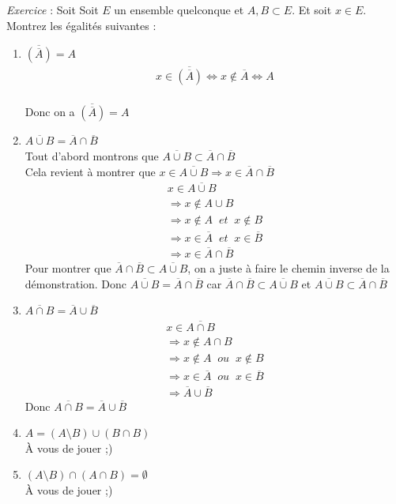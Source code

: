 \documentclass{report}
\begin{document}
\emph{Exercice} : Soit Soit $E$ un ensemble quelconque et $A,B \subset E$. Et soit $x \in E$. Montrez les égalités suivantes : 
\begin{enumerate}
    \item $\overline{(\overline{A})} = A$
        \begin{gather}
            x \in \overline{(\overline{A})} \Leftrightarrow x \notin \overline{A} \Leftrightarrow A
        \end{gather} \\
        Donc on a $\overline{(\overline{A})} = A$
    \item $\overline{A \cup B} = \overline{A} \cap \overline{B}$ \\ 
        Tout d’abord montrons que \begin{math}
            \overline{A \cup B} \subset \overline{A} \cap \overline{B}
        \end{math} \\ 
        Cela revient à montrer que $x \in \overline{A \cup B} \Rightarrow x \in \overline{A} \cap \overline{B} $ 
        \begin{gather}
            x \in \overline{A \cup B} \\ \Rightarrow x \notin A \cup B  \\ \Rightarrow  x \notin A \; \; et \; \; x \notin B \\ \Rightarrow x \in \overline{A} \; \; et \; \; x \in \overline{B} \\ \Rightarrow x \in \overline{A} \cap \overline{B}
        \end{gather}
        Pour montrer que $\overline{A} \cap \overline{B} \subset \overline{A \cup B}$, on a juste à faire le chemin inverse de la démonstration.
        Donc $\overline{A \cup B} = \overline{A} \cap \overline{B}$ car $\overline{A} \cap \overline{B} \subset \overline{A \cup B}$ et $\overline{A \cup B}  \subset \overline{A} \cap \overline{B}$
    \item $\overline{A \cap B} = \overline{A} \cup \overline{B}$
        \begin{gather}
            x \in \overline{A \cap B} \\ \Rightarrow x \notin A \cap B \\ \Rightarrow x \notin A \; \; ou \; \; x \notin B \\ \Rightarrow x \in \overline{A} \; \; ou \; \; x \in \overline{B} \\ \Rightarrow \overline{A} \cup \overline{B}
        \end{gather}
        Donc $\overline{A \cap B} = \overline{A} \cup \overline{B}$
    \item $A = (A \setminus B) \cup (B \cap B)$ \\
        À vous de jouer ;)
    \item $(A \setminus B) \cap (A \cap B) = \emptyset$ \\
        À vous de jouer ;)
\end{enumerate}
\end{document}

